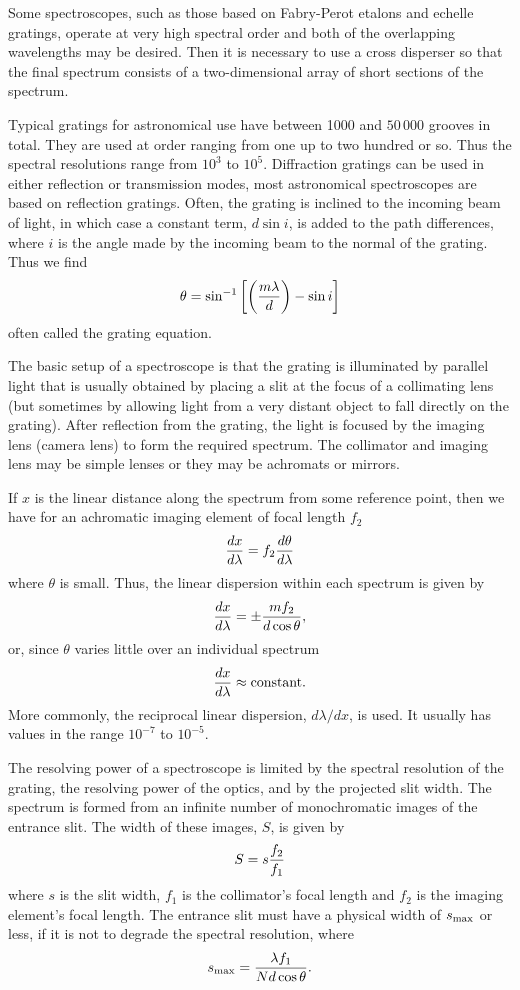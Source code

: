Some spectroscopes, such as those based on Fabry-Perot etalons and echelle gratings, 
operate at very high spectral order and both of the overlapping wavelengths may be
desired. Then it is necessary to use a cross disperser so that the final spectrum 
consists of a two-dimensional array of short sections of the spectrum.

Typical gratings for astronomical use have between 1000 and $50\,000$ grooves in total.
They are used at order ranging from one up to two hundred or so. Thus the spectral 
resolutions range from $10^3$ to $10^5$. Diffraction gratings can be used in either 
reflection or transmission modes, most astronomical spectroscopes are based on reflection gratings. Often, the grating is inclined to the incoming beam of light, in which
case a constant term, $d\sin i$, is added to the path differences, where $i$ is the angle
made by the incoming beam to the normal of the grating. Thus we find
\[
\theta=\sin^{-1}\left[\left({m\lambda\over d}\right)-\sin i\right]
\]
often called the grating equation.

The basic setup of a spectroscope is that the grating is illuminated by parallel light
that is usually obtained by placing a slit at the focus of a collimating lens (but sometimes by allowing light from a very distant object to fall directly on the grating).
After reflection from the grating, the light is focused by the imaging lens (camera lens)
to form the required spectrum. The collimator and imaging lens may be simple lenses or they may be achromats or mirrors.

If $x$ is the linear distance along the spectrum from some reference point, then we have
for an achromatic imaging element of focal length $f_2$
\[
{dx\over d\lambda}=f_2{d\theta\over d\lambda}
\]
where $\theta$ is small. Thus, the linear dispersion within each spectrum is given by
\[
{dx\over d\lambda}=\pm{mf_2\over d\cos\theta},
\]
or, since $\theta$ varies little over an individual spectrum
\[
{dx\over d\lambda}\approx {\rm constant}.
\]
More commonly, the reciprocal linear dispersion, ${d\lambda/dx}$, is used. It usually 
has values in the range $10^{-7}$ to $10^{-5}$.

The resolving power of a spectroscope is limited by the spectral resolution of the grating,
the resolving power of the optics, and by the projected slit width. The spectrum is formed
from an infinite number of monochromatic images of the entrance slit. The width of 
these images, $S$, is given by
\[
S=s{f_2\over f_1}
\]
where $s$ is the slit width, $f_1$ is the collimator's focal length and $f_2$ is the imaging element's focal length. The entrance slit must have a physical width of
$s_{\rm max}$ or less, if it is not to degrade the spectral resolution, where
\[
s_{\rm max}={\lambda f_1\over N d\cos\theta}.
\]

